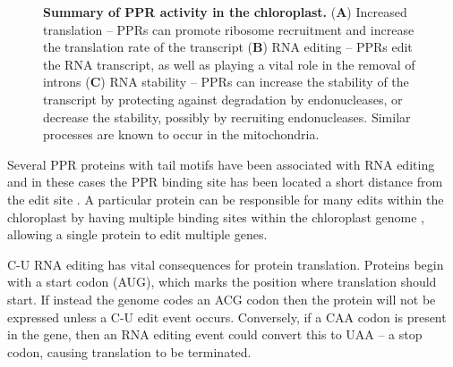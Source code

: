 \begin{figure}
  \begin{center}
  \end{center}
  \caption[LoF entry]{
    \textbf{Summary of PPR activity in the chloroplast.} 
    (\textbf{A}) Increased translation -- PPRs can promote ribosome recruitment
      and increase the translation rate of the transcript
    (\textbf{B}) RNA editing -- PPRs edit the RNA transcript, as well as
      playing a vital role in the removal of introns
    (\textbf{C}) RNA stability -- PPRs can increase the stability
      of the transcript by protecting against degradation by endonucleases, or 
      decrease the stability, possibly by recruiting endonucleases.
    Similar processes are known to occur in the mitochondria.
  }
  \label{fig:PPR_activity}
\end{figure}


Several PPR proteins with tail motifs have been associated with RNA editing and
in these cases the PPR binding site has been located a short distance from the
edit site \citep{Okuda2007,Yagi2013a}.
A particular protein can be responsible for many edits within the chloroplast
by having multiple binding sites within the chloroplast genome 
\citep{Okuda2012}, allowing a single protein to edit multiple genes.

C-U RNA editing has vital consequences for protein translation.
Proteins begin with a start codon (AUG), which marks the position where
translation should start.
If instead the genome codes an ACG codon then the protein will not be expressed
unless a C-U edit event occurs.
Conversely, if a CAA codon is present in the gene, then an RNA
editing event could convert this to UAA -- a stop codon, causing translation to
be terminated.

